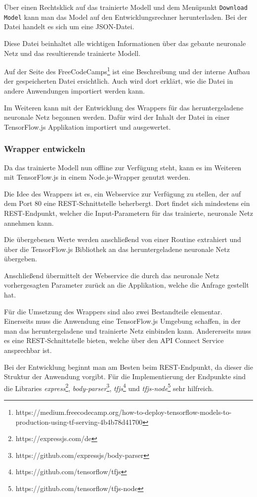Über einen Rechtsklick auf das trainierte Modell und dem Menüpunkt \texttt{Download Model} kann man das Model auf den
Entwicklungsrechner herunterladen. Bei der Datei handelt es sich um eine JSON-Datei.

Diese Datei beinhaltet alle wichtigen Informationen über das gebaute neuronale Netz und das resultierende trainierte
Modell.

Auf der Seite des
FreeCodeCamps\footnote{https://medium.freecodecamp.org/how-to-deploy-tensorflow-models-to-production-using-tf-serving-4b4b78d41700}
ist eine Beschreibung und der interne Aufbau der gespeicherten Datei ersichtlich. Auch wird dort erklärt, wie die Datei
in andere Anwendungen importiert werden kann.

Im Weiteren kann mit der Entwicklung des Wrappers für das heruntergeladene neuronale Netz begonnen werden. Dafür wird
der Inhalt der Datei in einer TensorFlow.js Applikation importiert und ausgewertet.

\subsubsection{Wrapper entwickeln}
Da das trainierte Modell nun offline zur Verfügung steht, kann es im Weiteren mit TensorFlow.js in einem Node.js-Wrapper
genutzt werden.

Die Idee des Wrappers ist es, ein Webservice zur Verfügung zu stellen, der auf dem Port 80 eine REST-Schnittstelle
beherbergt. Dort findet sich mindestens ein REST-Endpunkt, welcher die Input-Parametern für das trainierte,
neuronale Netz annehmen kann.

Die übergebenen Werte werden anschließend von einer Routine extrahiert und über die TensorFlow.js Bibliothek an das
heruntergeladene neuronale Netz übergeben.

Anschließend übermittelt der Webservice die durch das neuronale Netz vorhergesagten Parameter zurück an die Applikation,
welche die Anfrage gestellt hat.

Für die Umsetzung des Wrappers sind also zwei Bestandteile elementar. Einerseits muss die Anwendung eine TensorFlow.js
Umgebung schaffen, in der man das heruntergeladene und trainierte Netz einbinden kann. Andererseits muss es eine
REST-Schnittstelle bieten, welche über den API Connect Service ansprechbar ist.

Bei der Entwicklung beginnt man am Besten beim REST-Endpunkt, da dieser die Struktur der Anwendung vorgibt. Für die
Implementierung der Endpunkte sind die Libraries \textit{express}\footnote{https://expressjs.com/de},
\textit{body-parser}\footnote{https://github.com/expressjs/body-parser},
\textit{tfjs}\footnote{https://github.com/tensorflow/tfjs} und
\textit{tfjs-node}\footnote{https://github.com/tensorflow/tfjs-node} sehr hilfreich.

